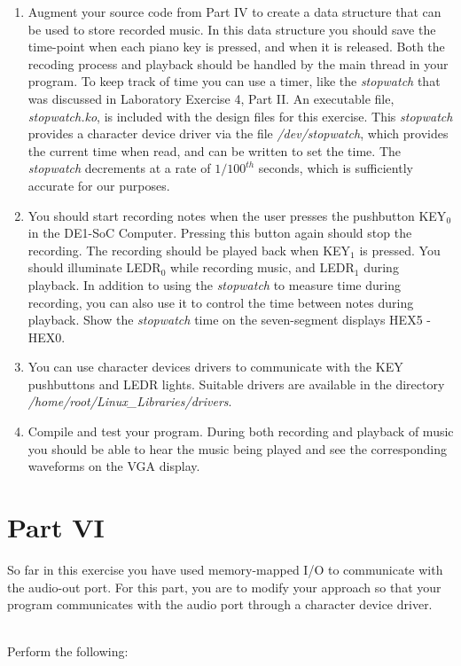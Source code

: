 \documentclass[epsfig,10pt,fullpage]{article}
\begin{document}
\begin{enumerate}
\item Augment your source code from Part IV to create a data structure that can be used to
store recorded music. In this data structure you should save the time-point when each piano key is
pressed, and when it is released. Both the recoding process and playback should be handled
by the main thread in your program. To keep track of time you can use a timer, like the
{\it stopwatch} that was discussed in Laboratory Exercise 4, Part II.  An executable file, 
{\it stopwatch.ko}, is included with the design files for this exercise.  This {\it stopwatch}
provides a character device driver via the file {\it /dev/stopwatch}, which provides the current
time when read, and can be written to set the time. The {\it stopwatch} decrements at a
rate of $1/100^{th}$ seconds, which is sufficiently accurate for our purposes.
\item You should start recording notes when the user presses the pushbutton KEY$_0$ in the
DE1-SoC Computer. Pressing this button again should stop the recording. The recording should be
played back when KEY$_1$ is pressed. You should illuminate LEDR$_0$ while recording
music, and LEDR$_1$ during playback. In addition to using the {\it stopwatch} to measure
time during recording, you can also use it to control the time between notes during
playback. Show the {\it stopwatch} time on the seven-segment displays HEX5 - HEX0.
\item You can use character devices drivers to communicate with the KEY pushbuttons and LEDR
lights. Suitable drivers are available in the directory
{\it /home/root/Linux\_Libraries/drivers}.
\item Compile and test your program. During both recording and playback of music you
should be able to hear the music being played and see the corresponding waveforms on the
VGA display.
\end{enumerate}

\newpage
\noindent
\section*{Part VI}

\noindent
So far in this exercise you have used memory-mapped I/O to communicate with the audio-out
port. For this part, you are to modify your approach so that your program communicates with
the audio port through a character device driver.

~\\
\noindent
Perform the following:
\end{document}
